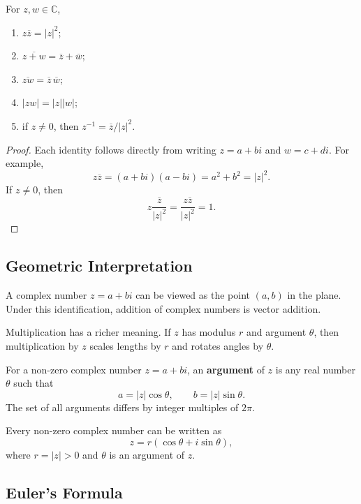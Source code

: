 \begin{proposition}
For $z,w\in\mathbb{C}$,
\begin{enumerate}
    \item $z\overline{z}=|z|^2$;
    \item $\overline{z+w}=\overline{z}+\overline{w}$;
    \item $\overline{zw}=\overline{z}\,\overline{w}$;
    \item $|zw|=|z||w|$;
    \item if $z\neq 0$, then $z^{-1}=\overline{z}/|z|^2$.
\end{enumerate}
\end{proposition}

\begin{proof}
Each identity follows directly from writing $z=a+bi$ and $w=c+di$. For example,
\[
    z\overline{z}=(a+bi)(a-bi)=a^2+b^2=|z|^2.
\]
If $z\neq 0$, then
\[
    z\frac{\overline{z}}{|z|^2}=\frac{z\overline{z}}{|z|^2}=1.
\]
\end{proof}

\subsection{Geometric Interpretation}

A complex number $z=a+bi$ can be viewed as the point $(a,b)$ in the plane. Under this identification, addition of complex numbers is vector addition.

Multiplication has a richer meaning. If $z$ has modulus $r$ and argument $\theta$, then multiplication by $z$ scales lengths by $r$ and rotates angles by $\theta$.

\begin{definition}[Argument]
For a non-zero complex number $z=a+bi$, an \textbf{argument} of $z$ is any real number $\theta$ such that
\[
    a=|z|\cos\theta,
    \qquad
    b=|z|\sin\theta.
\]
The set of all arguments differs by integer multiples of $2\pi$.
\end{definition}

\begin{definition}
Every non-zero complex number can be written as
\[
    z=r(\cos\theta+i\sin\theta),
\]
where $r=|z|>0$ and $\theta$ is an argument of $z$.
\end{definition}

\subsection{Euler's Formula}

